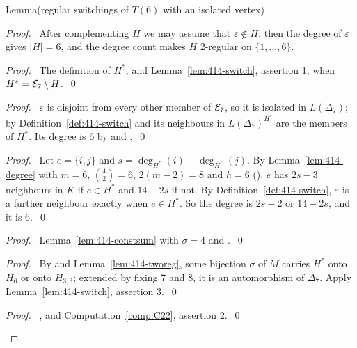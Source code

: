 \begin{namedresult}{Lemma}{(regular switchings of $T(6)$ with an isolated vertex)}\label{lem:414-E7}
\end{namedresult}
\begin{proof}
 \pfsketch\ After complementing $H$ we may assume that $\varepsilon\notin H$; then the degree
 of $\varepsilon$ gives $|H|=6$, and the degree count makes $H$ 2-regular on
 $\{1,\dots,6\}$.
 \begin{proof}\pf\ The definition of $H^*$, and Lemma~\ref{lem:414-switch}, assertion 1, when
  $H^*=\mathcal E_7\setminus H$.~\qed\end{proof}
 \begin{proof}\pf\ $\varepsilon$ is disjoint from every other member of $\mathcal E_7$, so it is
  isolated in $L(\Delta_7)$; by Definition~\ref{def:414-switch} and  its
  neighbours in $L(\Delta_7)^{H^*}$ are the members of $H^*$. Its degree is 6 by  and
  .~\qed\end{proof}
 \begin{proof}\pf\ Let $e=\{i,j\}$ and $s=\deg_{H^*}(i)+\deg_{H^*}(j)$. By
  Lemma~\ref{lem:414-degree} with $m=6$, $\binom42=6$, $2(m-2)=8$ and $h=6$
  (), $e$ has $2s-3$ neighbours in $K$ if $e\in H^*$ and $14-2s$ if not. By
  Definition~\ref{def:414-switch}, $\varepsilon$ is a further neighbour exactly when $e\in H^*$.
  So the degree is $2s-2$ or $14-2s$, and it is 6.~\qed\end{proof}
 \begin{proof}\pf\ Lemma~\ref{lem:414-constsum} with $\sigma=4$ and
  .~\qed\end{proof}
 \begin{proof}\pf\ By  and Lemma~\ref{lem:414-tworeg}, some bijection
  $\sigma$ of $M$ carries $H^*$ onto $H_6$ or onto $H_{3,3}$; extended by fixing 7 and 8, it is
  an automorphism of $\Delta_7$. Apply Lemma~\ref{lem:414-switch}, assertion 3.~\qed\end{proof}
 \qedstep
 \begin{proof}\pf\ ,  and
  Computation~\ref{comp:C22}, assertion 2.~\qed\end{proof}
\end{proof}

